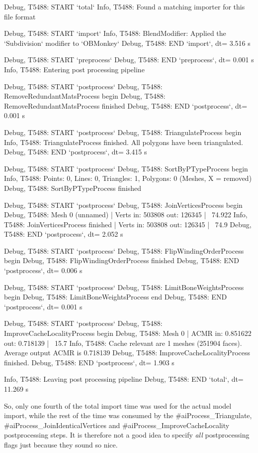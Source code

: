 \begin{DoxyVerb}Debug, T5488: START `total`
Info,  T5488: Found a matching importer for this file format


Debug, T5488: START `import`
Info,  T5488: BlendModifier: Applied the `Subdivision` modifier to `OBMonkey`
Debug, T5488: END   `import`, dt= 3.516 s


Debug, T5488: START `preprocess`
Debug, T5488: END   `preprocess`, dt= 0.001 s
Info,  T5488: Entering post processing pipeline


Debug, T5488: START `postprocess`
Debug, T5488: RemoveRedundantMatsProcess begin
Debug, T5488: RemoveRedundantMatsProcess finished 
Debug, T5488: END   `postprocess`, dt= 0.001 s


Debug, T5488: START `postprocess`
Debug, T5488: TriangulateProcess begin
Info,  T5488: TriangulateProcess finished. All polygons have been triangulated.
Debug, T5488: END   `postprocess`, dt= 3.415 s


Debug, T5488: START `postprocess`
Debug, T5488: SortByPTypeProcess begin
Info,  T5488: Points: 0, Lines: 0, Triangles: 1, Polygons: 0 (Meshes, X = removed)
Debug, T5488: SortByPTypeProcess finished

Debug, T5488: START `postprocess`
Debug, T5488: JoinVerticesProcess begin
Debug, T5488: Mesh 0 (unnamed) | Verts in: 503808 out: 126345 | ~74.922
Info,  T5488: JoinVerticesProcess finished | Verts in: 503808 out: 126345 | ~74.9
Debug, T5488: END   `postprocess`, dt= 2.052 s

Debug, T5488: START `postprocess`
Debug, T5488: FlipWindingOrderProcess begin
Debug, T5488: FlipWindingOrderProcess finished
Debug, T5488: END   `postprocess`, dt= 0.006 s


Debug, T5488: START `postprocess`
Debug, T5488: LimitBoneWeightsProcess begin
Debug, T5488: LimitBoneWeightsProcess end
Debug, T5488: END   `postprocess`, dt= 0.001 s


Debug, T5488: START `postprocess`
Debug, T5488: ImproveCacheLocalityProcess begin
Debug, T5488: Mesh 0 | ACMR in: 0.851622 out: 0.718139 | ~15.7
Info,  T5488: Cache relevant are 1 meshes (251904 faces). Average output ACMR is 0.718139
Debug, T5488: ImproveCacheLocalityProcess finished. 
Debug, T5488: END   `postprocess`, dt= 1.903 s


Info,  T5488: Leaving post processing pipeline
Debug, T5488: END   `total`, dt= 11.269 s
\end{DoxyVerb}


So, only one fourth of the total import time was used for the actual model import, while the rest of the time was consumed by the \#ai\+Process\+\_\+\+Triangulate, \#ai\+Process\+\_\+\+Join\+Identical\+Vertices and \#ai\+Process\+\_\+\+Improve\+Cache\+Locality postprocessing steps. It is therefore not a good idea to specify {\itshape all} postprocessing flags just because they sound so nice. 